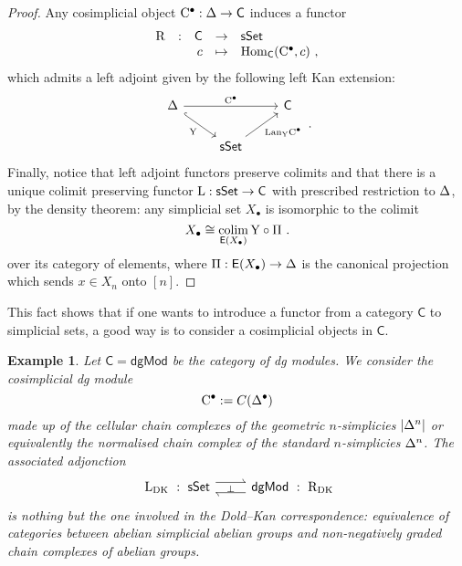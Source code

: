 \documentclass[twoside, 10pt]{amsart}
\newtheorem{example}[lemma]{Example}
\begin{document}
\begin{proof}
Any cosimplicial object $\mathrm{C}^\bullet : \mathrm{\Delta} \to \mathsf{C}$ induces a functor 
\[
\begin{array}{ccrcl}
\mathrm{R} &:&\mathsf{C} & \to & \sSe
\\
&&c &\mapsto& \Hom_{\mathsf{C}}(\mathrm{C}^\bullet, c)\ , 
\end{array}
\]
which admits a left adjoint given by the following left Kan extension: 
\[\vcenter{\hbox{\begin{tikzcd}
\cD \arrow[rr, "\mathrm{C}^\bullet"] \arrow[hookrightarrow, dr, "\mathrm{Y}"']&  
& \mathsf{C} \\
&\sSe \arrow[ur, "\mathrm{Lan}_\mathrm{Y} \mathrm{C}^\bullet"']&
\end{tikzcd}}}\ .\]
Finally, notice that left adjoint functors preserve colimits and that there is a unique  colimit preserving functor $\mathrm{L} : \mathsf{sSet} \to \mathsf{C}$ with prescribed restriction to $\mathrm{\Delta}$, by the density theorem: any simplicial set $X_\bullet$ is isomorphic to the colimit 
$$X_\bullet\cong \mathop{\rm colim}_{\mathsf{E}(X_\bullet)} \mathrm{Y}\circ \Pi \ .$$
over its category of elements, where 
  $\Pi : \mathsf{E}(X_\bullet) \to \mathrm{\Delta}$ is the canonical projection which sends $x\in X_n$ onto $[n]$. 
\end{proof}

This fact shows that if one wants to introduce a functor from a category $\mathsf{C}$ to simplicial sets, a good way is to consider a cosimplicial objects in $\mathsf{C}$. 

\begin{example}
Let $\mathsf{C}=\mathsf{dg Mod}$ be the category of dg modules. We consider the cosimplicial dg module 
\[\mathrm{C}^\bullet:=C(\mathrm{\Delta}^{\bullet})\]
made up of the cellular chain complexes of the geometric $n$-simplicies $|\mathrm{\Delta}^{n}|$ or equivalently the normalised chain complex of the standard $n$-simplicies $\mathrm{\Delta}^{n}$. The associated adjonction 
\[
\vcenter{\hbox{
\begin{tikzcd}
{\ \ \mathrm{L}_{\mathrm{DK}} \ : \ \sSe}
\arrow[r, harpoon, shift left=0.9ex, "\perp"']
&
\arrow[l, harpoon,  shift left=0.9ex]
\mathsf{dg Mod}\ : \ \mathrm{R}_{\mathrm{DK}}\ 
\end{tikzcd}
}}
\]
is nothing but the one involved in the Dold--Kan correspondence: equivalence of categories between abelian simplicial abelian groups and non-negatively graded chain complexes of abelian groups.
\end{example}
\end{document}
